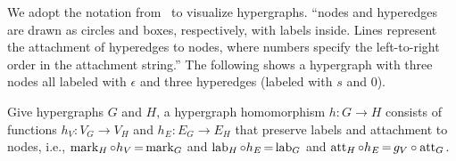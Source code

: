 \begin{example}
    We adopt the notation from~\cite[]{plump2018modular} to visualize hypergraphs. \enquote{nodes and hyperedges are drawn as circles and boxes, respectively, with labels inside. Lines represent the attachment of hyperedges to nodes, where numbers specify the left-to-right order in the attachment string.} The following shows a hypergraph with three nodes all labeled with $\epsilon$ and three hyperedges (labeled with $s$ and $0$).

\end{example}

\begin{definition}
    Give hypergraphs $G$ and $H$, a hypergraph homomorphism $h : G \mathop{\to} H$ consists of functions $h_V : V_G \mathop{\to} V_H$ and $h_E : E_G \mathop{\to} E_H$ that preserve labels and attachment to nodes, i.e., $\operatorname{mark}_H \circ h_V \mathop{=} \operatorname{mark}_G$ and $\operatorname{lab}_H \circ h_E \mathop{=} \operatorname{lab}_G$ and $\operatorname{att}_H \circ h_E \mathop{=} g_V \circ \operatorname{att}_G$.
\end{definition}